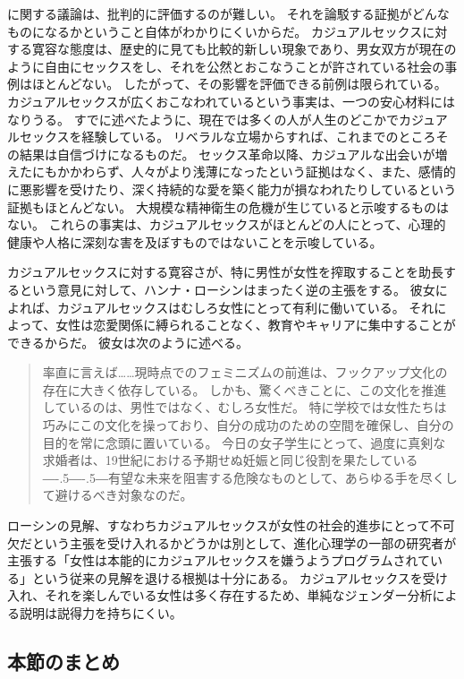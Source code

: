 \documentclass[paper=a4,book,openany]{jlreq}
\def\DDASH{―\kern-.5\zw―\kern-.5\zw―}
\begin{document}
に関する議論は、批判的に評価するのが難しい。
それを論駁する証拠がどんなものになるかということ自体がわかりにくいからだ。
カジュアルセックスに対する寛容な態度は、歴史的に見ても比較的新しい現象であり、男女双方が現在のように自由にセックスをし、それを公然とおこなうことが許されている社会の事例はほとんどない。
したがって、その影響を評価できる前例は限られている。
カジュアルセックスが広くおこなわれているという事実は、一つの安心材料にはなりうる。
すでに述べたように、現在では多くの人が人生のどこかでカジュアルセックスを経験している。
リベラルな立場からすれば、これまでのところその結果は自信づけになるものだ。
セックス革命以降、カジュアルな出会いが増えたにもかかわらず、人々がより浅薄になったという証拠はなく、また、感情的に悪影響を受けたり、深く持続的な愛を築く能力が損なわれたりしているという証拠もほとんどない。
大規模な精神衛生の危機が生じていると示唆するものはない。
これらの事実は、カジュアルセックスがほとんどの人にとって、心理的健康や人格に深刻な害を及ぼすものではないことを示唆している。

カジュアルセックスに対する寛容さが、特に男性が女性を搾取することを助長するという意見に対して、ハンナ・ローシンはまったく逆の主張をする。
彼女によれば、カジュアルセックスはむしろ女性にとって有利に働いている。
それによって、女性は恋愛関係に縛られることなく、教育やキャリアに集中することができるからだ。
彼女は次のように述べる。

\begin{quote}
  率直に言えば……現時点でのフェミニズムの前進は、フックアップ文化の存在に大きく依存している。
しかも、驚くべきことに、この文化を推進しているのは、男性ではなく、むしろ女性だ。
特に学校では女性たちは巧みにこの文化を操っており、自分の成功のための空間を確保し、自分の目的を常に念頭に置いている。
今日の女子学生にとって、過度に真剣な求婚者は、19世紀における予期せぬ妊娠と同じ役割を果たしている{\DDASH}有望な未来を阻害する危険なものとして、あらゆる手を尽くして避けるべき対象なのだ。
\citep{rosin12:_boys_side}
\end{quote}

ローシンの見解、すなわちカジュアルセックスが女性の社会的進歩にとって不可欠だという主張を受け入れるかどうかは別として、進化心理学の一部の研究者が主張する「女性は本能的にカジュアルセックスを嫌うようプログラムされている」という従来の見解を退ける根拠は十分にある。
カジュアルセックスを受け入れ、それを楽しんでいる女性は多く存在するため、単純なジェンダー分析による説明は説得力を持ちにくい。

\subsection{本節のまとめ}
\end{document}
